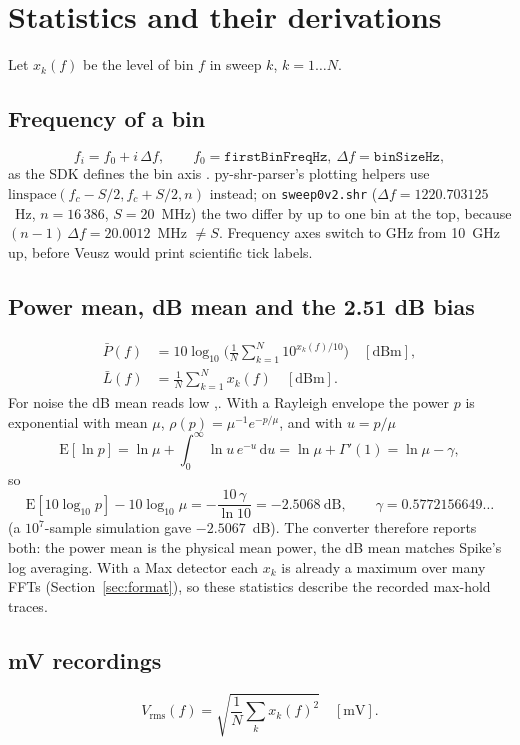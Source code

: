 \documentclass[11pt,a4paper]{article}
\newcommand{\code}[1]{\texttt{#1}}
\begin{document}
\section{Statistics and their derivations}
Let $x_k(f)$ be the level of bin $f$ in sweep $k$, $k=1\ldots N$.
\subsection{Frequency of a bin}
\begin{equation}f_i = f_0 + i\,\Delta f,\qquad f_0=\code{firstBinFreqHz},\ \Delta f=\code{binSizeHz},\end{equation}
as the SDK defines the bin axis \cite{r1}.
py-shr-parser's plotting helpers \cite{r10} use $\mathrm{linspace}(f_c-S/2, f_c+S/2, n)$ instead; on
\code{sweep0v2.shr} ($\Delta f = 1220.703125$~Hz, $n=16\,386$, $S=20$~MHz) the two differ by up to one bin at
the top, because $(n-1)\,\Delta f = 20.0012$~MHz $\neq S$. Frequency axes switch to GHz from 10~GHz up, before
Veusz would print scientific tick labels.
\subsection{Power mean, dB mean and the 2.51 dB bias}
\begin{align}
\bar P(f) &= 10\log_{10}\!\Big(\frac1N\sum_{k=1}^{N}10^{x_k(f)/10}\Big)\quad[\mathrm{dBm}],\\
\bar L(f) &= \frac1N\sum_{k=1}^{N}x_k(f)\quad[\mathrm{dBm}].
\end{align}
For noise the dB mean reads low \cite{r4},\cite{r13}. With a Rayleigh envelope the power $p$ is exponential
with mean $\mu$, $\rho(p)=\mu^{-1}e^{-p/\mu}$, and with $u=p/\mu$
\begin{equation}
\mathrm{E}[\ln p]=\ln\mu+\int_0^\infty \ln u\,e^{-u}\,\mathrm du=\ln\mu+\Gamma'(1)=\ln\mu-\gamma,
\end{equation}
so
\begin{equation}
\mathrm{E}[10\log_{10}p]-10\log_{10}\mu=-\frac{10\,\gamma}{\ln 10}=-2.5068~\mathrm{dB},
\qquad \gamma=0.5772156649\ldots
\end{equation}
(a $10^7$-sample simulation gave $-2.5067$~dB). The converter therefore reports both: the power mean is the
physical mean power, the dB mean matches Spike's log averaging. With a Max detector each $x_k$ is already a
maximum over many FFTs (Section~\ref{sec:format}), so these statistics describe the recorded max-hold traces.
\subsection{mV recordings}
\begin{equation}V_\mathrm{rms}(f)=\sqrt{\frac1N\sum_k x_k(f)^2}\quad[\mathrm{mV}].\end{equation}
\end{document}
